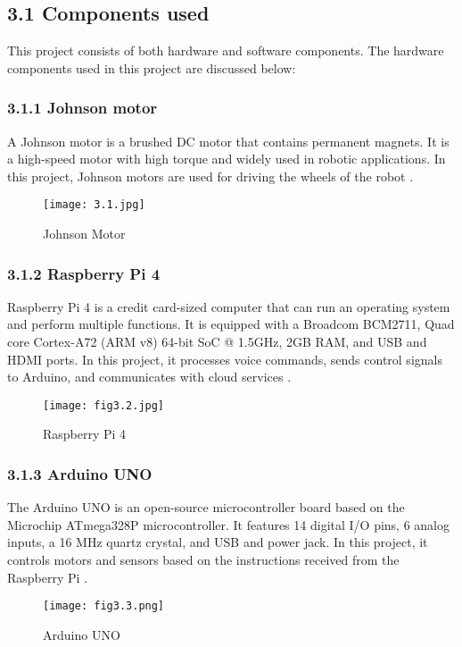 \subsection*{3.1 Components used}
This project consists of both hardware and software components. The hardware components used in this project are discussed below:

\subsubsection*{3.1.1 Johnson motor}
A Johnson motor is a brushed DC motor that contains permanent magnets. It is a high-speed motor with high torque and widely used in robotic applications. In this project, Johnson motors are used for driving the wheels of the robot \cite{7}.

\begin{figure}[H]
    \centering
    \texttt{[image: 3.1.jpg]}
    \caption{Johnson Motor}
    \label{fig:3.1}
\end{figure}

\subsubsection*{3.1.2 Raspberry Pi 4}
Raspberry Pi 4 is a credit card-sized computer that can run an operating system and perform multiple functions. It is equipped with a Broadcom BCM2711, Quad core Cortex-A72 (ARM v8) 64-bit SoC @ 1.5GHz, 2GB RAM, and USB and HDMI ports. In this project, it processes voice commands, sends control signals to Arduino, and communicates with cloud services \cite{8}.

\begin{figure}[H]
    \centering
    \texttt{[image: fig3.2.jpg]}
    \caption{Raspberry Pi 4}
    \label{fig:3.2}
\end{figure}

\subsubsection*{3.1.3 Arduino UNO}
The Arduino UNO is an open-source microcontroller board based on the Microchip ATmega328P microcontroller. It features 14 digital I/O pins, 6 analog inputs, a 16 MHz quartz crystal, and USB and power jack. In this project, it controls motors and sensors based on the instructions received from the Raspberry Pi \cite{9}.

\begin{figure}[H]
    \centering
    \texttt{[image: fig3.3.png]}
    \caption{Arduino UNO}
    \label{fig:3.3}
\end{figure}


